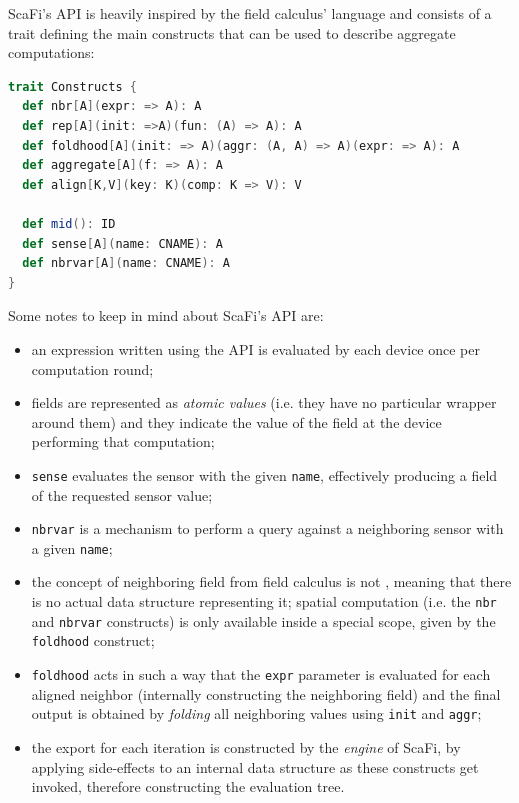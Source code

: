 ScaFi's API is heavily inspired by the field calculus' language and consists of a trait defining the main constructs that can be used to describe aggregate computations:
%
\begin{lstlisting}[frame=single, language=scala]
trait Constructs {
  def nbr[A](expr: => A): A
  def rep[A](init: =>A)(fun: (A) => A): A
  def foldhood[A](init: => A)(aggr: (A, A) => A)(expr: => A): A
  def aggregate[A](f: => A): A
  def align[K,V](key: K)(comp: K => V): V

  def mid(): ID
  def sense[A](name: CNAME): A
  def nbrvar[A](name: CNAME): A
}
\end{lstlisting}
%
Some notes to keep in mind about ScaFi's API are:
%
\begin{itemize}
    \item an expression written using the API is evaluated by each device once per computation round;
    \item fields are represented as \textit{atomic values} (i.e. they have no particular wrapper around them) and they indicate the value of the field at the device performing that computation;
    \item \texttt{sense} evaluates the sensor with the given \texttt{name}, effectively producing a field of the requested sensor value;
    \item \texttt{nbrvar} is a mechanism to perform a query against a neighboring sensor with a given \texttt{name};
    \item the concept of neighboring field from field calculus is not , meaning that there is no actual data structure representing it; spatial computation (i.e. the \texttt{nbr} and \texttt{nbrvar} constructs) is only available inside a special scope, given by the \texttt{foldhood} construct;
    \item \texttt{foldhood} acts in such a way that the \texttt{expr} parameter is evaluated for each aligned neighbor (internally constructing the neighboring field) and the final output is obtained by \textit{folding} all neighboring values using \texttt{init} and \texttt{aggr};
    \item the export for each iteration is constructed by the \textit{engine} of ScaFi, by applying side-effects to an internal data structure as these constructs get invoked, therefore constructing the evaluation tree.
\end{itemize}

